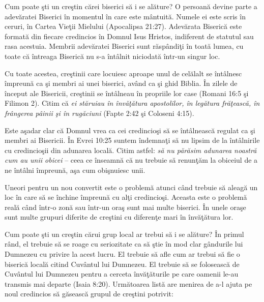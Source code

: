 \newpage


Cum poate şti un creştin cărei biserici să i se alăture? O persoană devine parte a adevăratei Biserici în momentul în care este mântuită. Numele ei este scris în ceruri, în Cartea Vieţii Mielului (Apocalipsa 21:27). Adevărata Biserică este formată din fiecare credincios în Domnul Isus Hristos, indiferent de statutul sau rasa acestuia. Membrii adevăratei Biserici sunt răspândiţi în toată lumea, cu toate că întreaga Biserică nu s-a întâlnit niciodată într-un singur loc.

Cu toate acestea, creştinii care locuiesc aproape unul de celălalt se întâlnesc împreună ca şi membri ai unei biserici, având ca şi ghid Biblia. În zilele de început ale Bisericii, creştinii se întâlneau în propriile lor case (Romani 16:5 şi Filimon 2). Citim că \textit{ei stăruiau în învăţătura apostolilor, în legătura frăţească, în frângerea pâinii şi în rugăciuni} (Fapte 2:42 şi Coloseni 4:15).

Este aşadar clar că Domnul vrea ca cei credincioşi să se întâlnească regulat ca şi membri ai Bisericii. În Evrei 10:25 suntem îndemnaţi să nu lipsim de la întâlnirile cu credincioşii din adunarea locală. Citim astfel: \textit{să nu părăsim adunarea noastră cum au unii obicei} – ceea ce înseamnă că nu trebuie să renunţăm la obiceiul de a ne întâlni împreună, aşa cum obişnuiesc unii.

Uneori pentru un nou convertit este o problemă atunci când trebuie să aleagă un loc în care să se închine împreună cu alţi credincioşi. Aceasta este o problemă reală când într-o zonă sau într-un oraş sunt mai multe biserici. În unele oraşe sunt multe grupuri diferite de creştini cu diferenţe mari în învăţătura lor.

Cum poate şti un creştin cărui grup local ar trebui să i se alăture? În primul rând, el trebuie să se roage cu seriozitate ca să ştie în mod clar gândurile lui Dumnezeu cu privire la acest lucru. El trebuie să afle cum ar trebui să fie o biserică locală citind Cuvântul lui Dumnezeu. El trebuie să se folosească de Cuvântul lui Dumnezeu pentru a cerceta învăţăturile pe care oamenii le-au transmis mai departe (Isaia 8:20). Următoarea listă are menirea de a-l ajuta pe noul credincios să găsească grupul de creştini potrivit:


